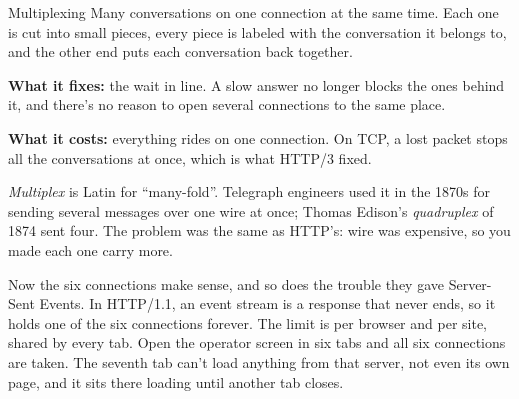 \begin{concept}{Multiplexing}
Many conversations on one connection at the same time. Each one is cut into
small pieces, every piece is labeled with the conversation it belongs to, and
the other end puts each conversation back together.

\textbf{What it fixes:} the wait in line. A slow answer no longer blocks the
ones behind it, and there's no reason to open several connections to the same
place.

\textbf{What it costs:} everything rides on one connection. On TCP, a lost
packet stops all the conversations at once, which is what HTTP/3 fixed.
\end{concept}

\begin{etymology}
\emph{Multiplex} is Latin for ``many-fold''. Telegraph engineers used it in the
1870s for sending several messages over one wire at once; Thomas Edison's
\emph{quadruplex} of 1874 sent four. The problem was the same as HTTP's: wire
was expensive, so you made each one carry more.
\end{etymology}

Now the six connections make sense, and so does the trouble they gave
Server-Sent Events. In HTTP/1.1, an event stream is a response that never ends,
so it holds one of the six connections forever. The limit is per browser and per
site, shared by every tab. Open the operator screen in six tabs and all six
connections are taken. The seventh tab can't load anything from that server,
not even its own page, and it sits there loading until another tab closes.

